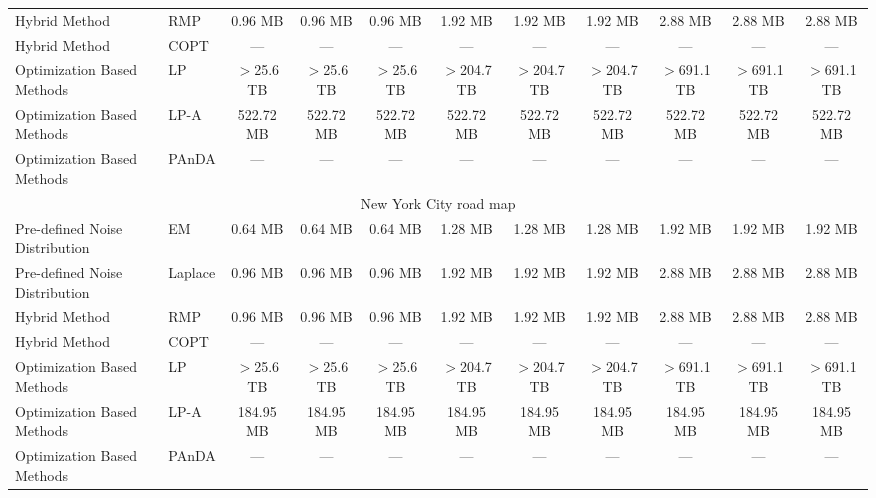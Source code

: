 \begin{table}[t]
{\begin{tabular}{ll|ccc|ccc|ccc}
Hybrid Method                  & RMP     & 0.96 MB & 0.96 MB & 0.96 MB & 1.92 MB & 1.92 MB & 1.92 MB & 2.88 MB & 2.88 MB & 2.88 MB \\
Hybrid Method                  & COPT    & --- & --- & --- & --- & --- & --- & --- & --- & --- \\
Optimization Based Methods     & LP      & $>$25.6 TB & $>$25.6 TB & $>$25.6 TB & $>$204.7 TB & $>$204.7 TB & $>$204.7 TB & $>$691.1 TB & $>$691.1 TB & $>$691.1 TB \\
Optimization Based Methods     & LP-A    & 522.72 MB & 522.72 MB & 522.72 MB & 522.72 MB & 522.72 MB & 522.72 MB & 522.72 MB & 522.72 MB & 522.72 MB \\
Optimization Based Methods     & PAnDA   & --- & --- & --- & --- & --- & --- & --- & --- & --- \\
\hline
\multicolumn{11}{c}{New York City road map} \\
\hline
Pre-defined Noise Distribution & EM      & 0.64 MB & 0.64 MB & 0.64 MB & 1.28 MB & 1.28 MB & 1.28 MB & 1.92 MB & 1.92 MB & 1.92 MB \\
Pre-defined Noise Distribution & Laplace & 0.96 MB & 0.96 MB & 0.96 MB & 1.92 MB & 1.92 MB & 1.92 MB & 2.88 MB & 2.88 MB & 2.88 MB \\
Hybrid Method                  & RMP     & 0.96 MB & 0.96 MB & 0.96 MB & 1.92 MB & 1.92 MB & 1.92 MB & 2.88 MB & 2.88 MB & 2.88 MB \\
Hybrid Method                  & COPT    & --- & --- & --- & --- & --- & --- & --- & --- & --- \\
Optimization Based Methods     & LP      & $>$25.6 TB & $>$25.6 TB & $>$25.6 TB & $>$204.7 TB & $>$204.7 TB & $>$204.7 TB & $>$691.1 TB & $>$691.1 TB & $>$691.1 TB \\
Optimization Based Methods     & LP-A    & 184.95 MB & 184.95 MB & 184.95 MB & 184.95 MB & 184.95 MB & 184.95 MB & 184.95 MB & 184.95 MB & 184.95 MB \\
Optimization Based Methods     & PAnDA   & --- & --- & --- & --- & --- & --- & --- & --- & --- \\
\hline
\end{tabular}%
}
\end{table}
